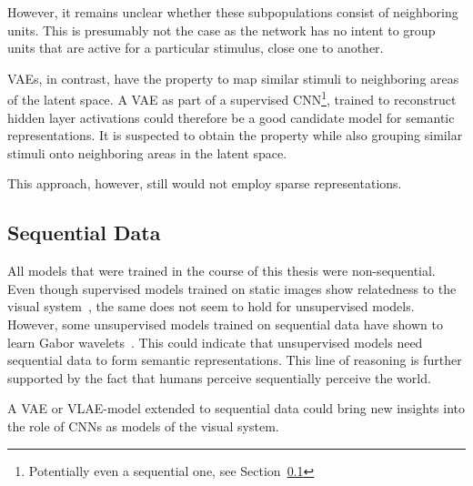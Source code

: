 However, it remains unclear whether these subpopulations consist of neighboring units.
This is presumably not the case as the network has no intent to group units that are active for a particular stimulus, close one to another.

\acfp{VAE}, in contrast, have the property to map similar stimuli to neighboring areas of the latent space.
A \ac{VAE} as part of a supervised \ac{CNN}\footnote{Potentially even a sequential one, see Section~\ref{subsec:sequential-data}}, trained to reconstruct hidden layer activations could therefore be a good candidate model for semantic representations.
It is suspected to obtain the  property while also grouping similar stimuli onto neighboring areas in the latent space.

This approach, however, still would not employ sparse representations.

\subsection{Sequential Data}\label{subsec:sequential-data}

All models that were trained in the course of this thesis were non-sequential.
Even though supervised models trained on static images show relatedness to the visual system~\citep{khaligh2014deep,cadieu2014deep,krizhevsky2012imagenet}, the same does not seem to hold for unsupervised models.
However, some unsupervised models trained on sequential data have shown to learn Gabor wavelets~\citep{berkes2005slow,palm2012prediction}.
This could indicate that unsupervised models need sequential data to form semantic representations.
This line of reasoning is further supported by the fact that humans perceive sequentially perceive the world.

A \ac{VAE} or \ac{VLAE}-model extended to sequential data could bring new insights into the role of \acp{CNN} as models of the visual system.